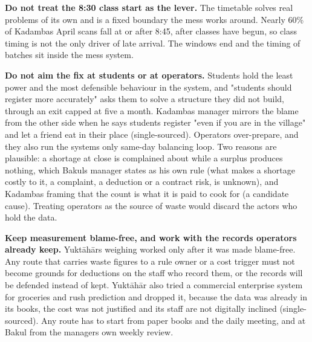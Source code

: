 \documentclass[
  10pt,
  table]{article}
\begin{document}
\textbf{Do not treat the 8:30 class start as the lever.} The timetable solves real problems of its own and is a fixed boundary the mess works around. Nearly 60\% of Kadamba\textquotesingle s April scans fall at or after 8:45, after classes have begun, so class timing is not the only driver of late arrival. The window\textquotesingle s end and the timing of batches sit inside the mess system.

\textbf{Do not aim the fix at students or at operators.} Students hold the least power and the most defensible behaviour in the system, and "students should register more accurately" asks them to solve a structure they did not build, through an exit capped at five a month. Kadamba\textquotesingle s manager mirrors the blame from the other side when he says students register "even if you are in the village" and let a friend eat in their place (single-sourced). Operators over-prepare, and they also run the system\textquotesingle s only same-day balancing loop. Two reasons are plausible: a shortage at close is complained about while a surplus produces nothing, which Bakul\textquotesingle s manager states as his own rule (what makes a shortage costly to it, a complaint, a deduction or a contract risk, is unknown), and Kadamba\textquotesingle s framing that the count is what it is paid to cook for (a candidate cause). Treating operators as the source of waste would discard the actors who hold the data.

\textbf{Keep measurement blame-free, and work with the records operators already keep.} Yuktāhār\textquotesingle s weighing worked only after it was made blame-free. Any route that carries waste figures to a rule owner or a cost trigger must not become grounds for deductions on the staff who record them, or the records will be defended instead of kept. Yuktāhār also tried a commercial enterprise system for groceries and rush prediction and dropped it, because the data was already in its books, the cost was not justified and its staff are not digitally inclined (single-sourced). Any route has to start from paper books and the daily meeting, and at Bakul from the manager\textquotesingle s own weekly review.
\end{document}
